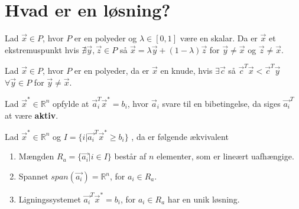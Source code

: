 \section{Hvad er en løsning?}


\begin{defn}[Ekstremuspunkt]
Lad $\vec{x} \in P$, hvor $P$ er en polyeder og $\lambda \in [0,1]$ være en skalar.
Da er $\vec{x}$ et ekstremuspunkt hvis $\nexists \vec{y}, \vec{z} \in P$ så $\vec{x} = \lambda \vec{y}+ (1- \lambda)\vec{z}$ for $\vec{y}\neq \vec{x}$ og $\vec{z}\neq \vec{x}$.
\end{defn}

\begin{defn}[Knude]
Lad $\vec{x} \in P$, hvor $P$ er en polyeder, da er $\vec{x}$ en knude, hvis $\exists \vec{c} $ så $\vec{c}^T \vec{x} < \vec{c}^T\vec{y}$ $\forall \vec{y} \in P$ for $\vec{y} \neq \vec{x}$.
\end{defn}


\begin{defn}
Lad $\vec{x}^* \in \mathds{R}^n$ opfylde at $\vec{a}_i^T\vec{x}^* = b_i$, hvor $\vec{a}_i$ svare til en bibetingelse, da siges $\vec{a_i}^T$ at være \textbf{aktiv}.
\end{defn}

\begin{stn}
Lad $\vec{x}^* \in \mathds{R}^n$ og $I = \{i | \vec{a_i}^T \vec{x}^*\geq b_i\}$ , da er følgende ækvivalent
\begin{enumerate}[label=(\alph*)]
\item Mængden $R_a =\{\vec{a_i}| i\in I\}$ består af $n$ elementer, som er lineært uafhængige.
\item Spannet $span(\vec{a_i}) = \mathds{R}^n$, for $a_i \in R_a$.
\item Ligningssystemet $\vec{a_i}^T \vec{x}^* = b_i$, for $a_i \in R_a$ har en unik løsning.
\end{enumerate}
\end{stn}

